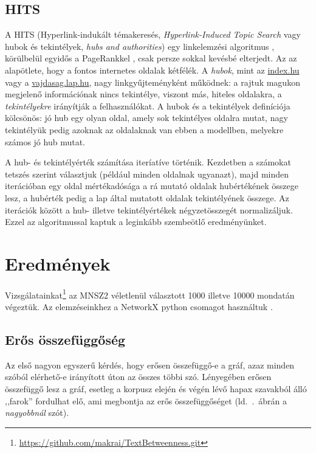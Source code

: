 \documentclass{llncs}
\begin{document}
\subsection{HITS}

A HITS (Hyperlink-indukált témakeresés, \emph{Hyperlink-Induced Topic Search}
vagy hubok és tekintélyek, \emph{hubs and authorities}) egy linkelemzési
algoritmus \cite{Kleinberg:1999},
körülbelül egyidős a PageRankkel \cite{page1999pagerank}, csak persze sokkal
kevésbé elterjedt.
Az az alapötlete, hogy a fontos internetes oldalak kétfélék.  A \emph{hubok},
mint az \href{https://index.hu/}{index.hu} vagy a
\href{https://vajdasag.lap.hu/}{vajdasag.lap.hu}, nagy linkgyűjteményként
működnek: a rajtuk magukon megjelenő információnak nincs tekintélye, viszont
más, hiteles oldalakra, a \emph{tekintélyekre} irányítják a felhasználókat. A
hubok és a tekintélyek definíciója kölcsönös: jó hub egy olyan oldal, amely sok
tekintélyes oldalra mutat, nagy tekintélyük pedig azoknak az oldalaknak van
ebben a modellben, melyekre számos jó hub mutat.

A hub- és tekintélyérték számítása iteríatíve történik.  Kezdetben a számokat
tetszés szerint választjuk (például minden oldalnak ugyanazt), majd minden
iterációban egy oldal mértékadósága a rá mutató oldalak hubértékének összege
lesz, a hubérték pedig a lap által mutatott oldalak tekintélyének összege.  Az
iterációk között a hub- illetve tekintélyértékek négyzetösszegét normalizáljuk.
Ezzel az algoritmussal kaptuk a leginkább szembeötlő eredményünket.

\section{Eredmények}
\label{sec:results}

Vizsgálatainkat\footnote{\url{https://github.com/makrai/TextBetweenness.git}}
az MNSZ2 \cite{oravecz2014hungarian} véletlenül választott 1000 illetve 10000
mondatán végeztük.
%
Az elemzéseinkhez a NetworkX python csomagot használtuk
\cite{hagberg2008exploring}.



\subsection{Erős összefüggőség}
Az első nagyon egyszerű kérdés, hogy erősen összefüggő-e a gráf,
azaz minden szóból elérhető-e irányított úton az összes többi szó.
Lényegében erősen összefüggő lesz a gráf,
esetleg a korpusz elején és végén lévő
hapax szavakból álló ,,farok'' fordulhat elő,
ami megbontja az erős összefüggőséget
(ld.\ .\ ábrán a \emph{nagyobbnál} szót).
\end{document}
